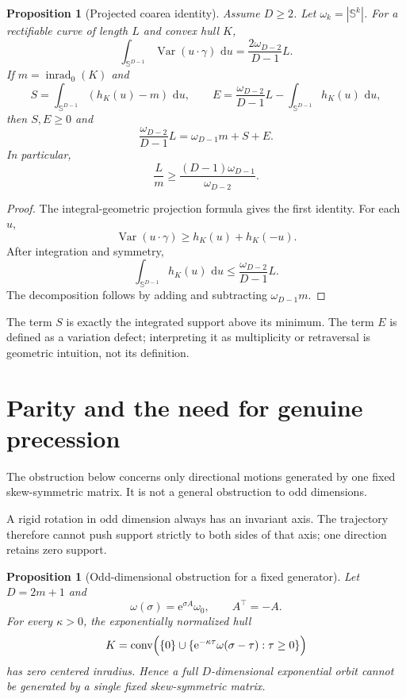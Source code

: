 \documentclass[10pt,a4paper]{article}
\newcommand{\Sph}{\mathbb{S}}
\newcommand{\conv}{\operatorname{conv}}
\newcommand{\inrad}{\operatorname{inrad}_{0}}
\newcommand{\Var}{\operatorname{Var}}
\newcommand{\dd}{\,\mathrm{d}}
\newcommand{\e}{\mathrm{e}}
\theoremstyle{plain}
\newtheorem{proposition}[theorem]{Proposition}
\theoremstyle{definition}
\theoremstyle{remark}
\begin{document}
\begin{proposition}[Projected coarea identity]
Assume $D\ge2$. Let $\omega_k=|\Sph^k|$. For a rectifiable curve of length $L$ and convex hull $K$,
\[
  \int_{\Sph^{D-1}}\Var(u\cdot\gamma)\,\dd u
  =\frac{2\omega_{D-2}}{D-1}L.
\]
If $m=\inrad(K)$ and
\[
  S=\int_{\Sph^{D-1}}(h_K(u)-m)\,\dd u,
  \qquad
  E=\frac{\omega_{D-2}}{D-1}L
    -\int_{\Sph^{D-1}}h_K(u)\,\dd u,
\]
then $S,E\ge0$ and
\[
  \frac{\omega_{D-2}}{D-1}L=\omega_{D-1}m+S+E.
\]
In particular,
\[
  \frac{L}{m}\ge\frac{(D-1)\omega_{D-1}}{\omega_{D-2}}.
\]
\end{proposition}

\begin{proof}
The integral-geometric projection formula gives the first identity. For each $u$,
\[
  \Var(u\cdot\gamma)\ge h_K(u)+h_K(-u).
\]
After integration and symmetry,
\[
  \int_{\Sph^{D-1}}h_K(u)\,\dd u
  \le\frac{\omega_{D-2}}{D-1}L.
\]
The decomposition follows by adding and subtracting $\omega_{D-1}m$.
\end{proof}

The term $S$ is exactly the integrated support above its minimum. The term $E$ is defined as a variation defect; interpreting it as multiplicity or retraversal is geometric intuition, not its definition.

\section{Parity and the need for genuine precession}
\label{sec:parity}

The obstruction below concerns only directional motions generated by one fixed skew-symmetric matrix. It is not a general obstruction to odd dimensions.

A rigid rotation in odd dimension always has an invariant axis. The trajectory therefore cannot push support strictly to both sides of that axis; one direction retains zero support.

\begin{proposition}[Odd-dimensional obstruction for a fixed generator]
Let $D=2m+1$ and
\[
  \omega(\sigma)=\e^{\sigma A}\omega_0,
  \qquad A^\top=-A.
\]
For every $\kappa>0$, the exponentially normalized hull
\[
  K=\conv\Bigl(\{0\}\cup\{\e^{-\kappa\tau}\omega(\sigma-\tau):\tau\ge0\}\Bigr)
\]
has zero centered inradius. Hence a full $D$-dimensional exponential orbit cannot be generated by a single fixed skew-symmetric matrix.
\end{proposition}
\end{document}
